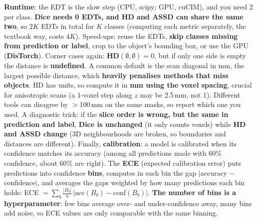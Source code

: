 \documentclass[a4paper]{article}
\newcommand{\K}[1]{\textcolor{kg}{\textbf{#1}}}
\newcommand{\F}[1]{\textcolor{fb}{#1}}
\newcommand{\E}[1]{\textcolor{ep}{#1}}
\newcommand{\T}[1]{\textcolor{tr}{\textbf{#1}}}
\begin{document}
\K{Runtime}: the EDT is the slow step (CPU, scipy; GPU, cuCIM), and you need 2 per class. \T{Dice needs 0 EDTs, and HD and ASSD can share the same two}, so $2K$ EDTs in total for $K$ classes (computing each metric separately, the textbook way, costs $4K$). Speed-ups: reuse the EDTs, \T{skip classes missing from prediction or label}, crop to the object's bounding box, or use the GPU (\K{DisTorch}). Corner cases again: \T{HD$(\emptyset,\emptyset)=0$}, but if only one side is empty the distance is \T{undefined}. A common default is the scan diagonal in mm, the largest possible distance, which \T{heavily penalises methods that miss objects}. HD has units, so compute it in \K{mm using the voxel spacing}, crucial for anisotropic scans (\E{a 1-voxel step along $z$ may be 2.5\,mm, not 1}). Different tools can disagree by \E{$>$100\,mm} on the same masks, so report which one you used.
A diagnostic trick: if the \T{slice order is wrong, but the same in prediction and label}, \T{Dice is unchanged} (it only counts voxels) while \T{HD and ASSD change} (3D neighbourhoods are broken, so boundaries and distances are different).
Finally, \K{calibration}: a model is calibrated when its confidence matches its accuracy (\E{among all predictions made with 60\% confidence, about 60\% are right}). The \K{ECE} (expected calibration error) puts predictions into confidence \K{bins}, computes in each bin the gap $|$accuracy $-$ confidence$|$, and averages the gaps weighted by how many predictions each bin holds: \F{ECE $=\sum_b\frac{|B_b|}{n}\,|\text{acc}(B_b)-\text{conf}(B_b)|$}. \T{The number of bins is a hyperparameter}: few bins average over- and under-confidence away, many bins add noise, so ECE values are only comparable with the same binning.
\end{document}
